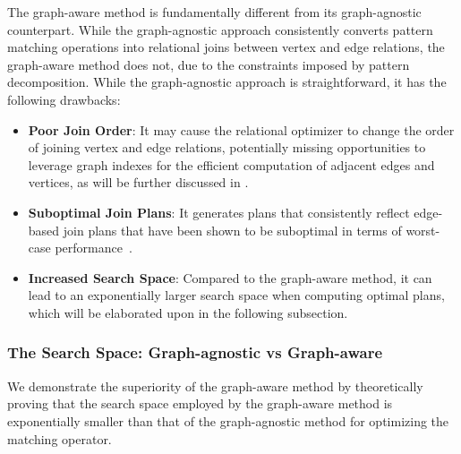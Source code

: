 
\begin{remark}
    \label{re:graph-agnostic-vs-graph-aware}
    The graph-aware method is fundamentally different from its graph-agnostic counterpart. While the graph-agnostic approach consistently converts pattern matching operations into relational joins between vertex and edge relations, the graph-aware method does not, due to the constraints imposed by pattern decomposition. While the graph-agnostic approach is straightforward, it has the following drawbacks:
    \begin{itemize}
    \item \textbf{Poor Join Order}: It may cause the relational optimizer to change the order of joining vertex and edge relations, potentially missing opportunities to leverage graph indexes for the efficient computation of adjacent edges and vertices, as will be further discussed in .
    \item \textbf{Suboptimal Join Plans}: It generates plans that consistently reflect edge-based join plans that have been shown to be suboptimal in terms of worst-case performance~\cite{lai2015scalable}.
    \item \textbf{Increased Search Space}: Compared to the graph-aware method, it can lead to an exponentially larger search space when computing optimal plans, which will be elaborated upon in the following subsection.
    \end{itemize}
\end{remark}

\subsubsection{The Search Space: Graph-agnostic vs Graph-aware}
\label{sec:compare-search-space}
We demonstrate the superiority of the graph-aware method by theoretically proving that the search space employed by the graph-aware method is exponentially smaller than that of the graph-agnostic method for optimizing the matching operator.


